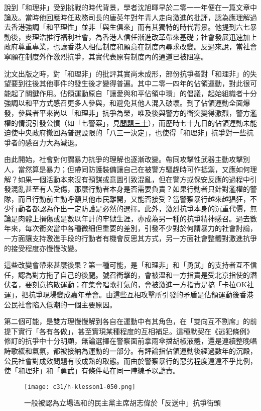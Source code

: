 說到「和理非」受到挑戰的時代背景，學者沈旭暉早於二零一一年便在一篇文章中論及。當時他回應時任政務司長的唐英年對年青人走向激進的批評，認為應理解過去香港強調「和平理性」並非「與生俱來」而有其獨特的時代背景。他提到六七暴動後，麥理浩推行福利社會，為香港人信任漸進改革帶來基礎；社會發展迅速加上政府尊重專業，也讓香港人相信制度和願意在制度內尋求改變。反過來說，當社會寧願在制度外作激烈抗爭，其實代表原有制度內的通道已被阻塞。

沈文出版之時，對「和理非」的批評其實尚未成形，部份抗爭者對「和理非」的失望要到往後其他事件的發生後才變得普遍。其中二零一四年的佔領運動，對此很可能起了關鍵作用。佔領運動原自「讓愛與和平佔領中環」的倡議，起始組織者十分強調以和平方式感召更多人參與，和避免其他人混入破壞。到了佔領運動全面爆發，參與者平來尚以「和理非」抗爭為榮，唯及後與警方的衝突變得激烈，警方濫權的情況引發公憤（如「七警案」，見\hyperref[sec:sec30]{問題三十}），而歷時七十九日的佔領運動未能迫使中央政府撤回為普選設限的「八三一決定」，也使得「和理非」抗爭對一些抗爭者的感召力大為減退。

由此開始，社會對何謂暴力抗爭的理解也逐漸改變。帶同攻擊性武器主動攻擊別人，當然算是暴力；但帶同防護裝備讓自己在被警方驅趕時可作抵禦，又應如何理解？如果一個活動本來沒有預謀或意圖引致混亂，但在警方或保安反應的過程中引發混亂甚至有人受傷，那麼行動者本身是否需要負責？如果行動者只針對濫權的警隊，而且行動前主動呼籲其他市民離開，又能否接受？當警察暴行越來越猖狂，不少行動者都認為作出一定防護是必然的選擇。此外，激烈抗爭本身的沉重代價，無論是肉體上損傷或是數以年計的牢獄生涯，亦成為另一種的抗爭精神感召。過去數年來，每次衝突當中各種微細但重要的差別，引發不少對於何謂暴力的社會討論，一方面讓支持激進手段的行動者有機會反思其方式，另一方面社會整體對激進抗爭的接受程度亦慢慢改變。

這些改變會帶來甚麼後果？第一種可能，是「和理非」和「勇武」的支持者互不信任，認為對方拖了自己的後腿。號召衝擊的，會被溫和一方指責是受北京指使的潛伏者，要刻意搞散運動；在集會唱歌打氣的，會被激進一方指責是搞「卡拉OK社運」，把抗爭現場變成嘉年華會。由這些互相攻擊所引發的矛盾是佔領運動後香港公民社會陷入低潮的一個主要原因。

第二個可能，是雙方理慢慢解到各自在運動中有其角色，在「雙向互不割席」的前提下實行「各有各做」，甚至實現某種程度的互相補足。這種默契在《逃犯條例》修訂的抗爭中十分明顯，無論選擇在警察面前拿雨傘擋胡椒液體，還是連續整晚唱詩歌緩和氣氛，都被接納為運動的一部分。有評論指佔領運動後經過數年的沉殿，公民社會對成效問題有較成熟的取態。而由於警察暴行的惡劣程度遠遠不乎比例，使「和理非」和「勇武」有條件站在同一陣線予以譴責。

\begin{figure}[htbp]
    \centering
    \texttt{[image: c31/h-klesson1-050.png]}
    \caption{一般被認為立場溫和的民主黨主席胡志偉於「反送中」抗爭街頭} 
\end{figure}

